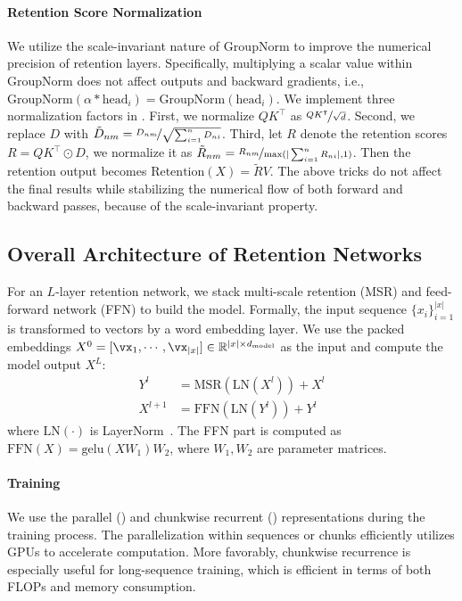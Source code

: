 \documentclass{article}
\begin{document}
\paragraph{Retention Score Normalization}
We utilize the scale-invariant nature of $\mathrm{GroupNorm}$ to improve the numerical precision of retention layers.
Specifically, multiplying a scalar value within $\mathrm{GroupNorm}$ does not affect outputs and backward gradients, i.e., $\mathrm{GroupNorm}(\alpha * \mathrm{head}_i) = \mathrm{GroupNorm}(\mathrm{head}_i)$.
We implement three normalization factors in .
First, we normalize $Q K^\intercal$ as $\nicefrac{Q K^\intercal}{\sqrt{d}}$.
Second, we replace $D$ with $\tilde{D}_{nm} = \nicefrac{D_{nm}}{\sqrt{\sum_{i=1}^{n}D_{ni}}}$.
Third, let $R$ denote the retention scores $R=QK^\intercal \odot D$, we normalize it as $\tilde{R}_{nm} = \nicefrac{R_{nm}}{\max(| \sum_{i=1}^{n} R_{ni} |, 1)}$. Then the retention output becomes $\mathrm{Retention}(X) = \tilde{R} V$.
The above tricks do not affect the final results while stabilizing the numerical flow of both forward and backward passes, because of the scale-invariant property.

\subsection{Overall Architecture of Retention Networks}
\label{sec:arch}

For an $L$-layer retention network, we stack multi-scale retention (MSR) and feed-forward network (FFN) to build the model.
Formally, the input sequence $\{x_i\}_{i=1}^{|x|}$ is transformed to vectors by a word embedding layer. We use the packed embeddings $X^0 = [\vx_1, \cdots, \vx_{|x|}] \in \mathbb{R}^{|x|\times d_\text{model}}$ as the input and compute the model output $X^L$:
\begin{equation}
\begin{aligned}
\label{eq:arch}
Y^l &= \mathrm{MSR}(\mathrm{LN}(X^l)) + X^l \\
X^{l+1} &= \mathrm{FFN}(\mathrm{LN}(Y^l)) + Y^l
\end{aligned}
\end{equation}
where $\mathrm{LN}(\cdot)$ is LayerNorm~\cite{layernorm}.
The FFN part is computed as $\mathrm{FFN}(X) = \mathrm{gelu}(X W_1) W_2$, where $W_1, W_2$ are parameter matrices.

\paragraph{Training}
We use the parallel () and chunkwise recurrent 
() representations during the training process.
The parallelization within sequences or chunks efficiently utilizes GPUs to accelerate computation.
More favorably, chunkwise recurrence is especially useful for long-sequence training, which is efficient in terms of both FLOPs and memory consumption.
\end{document}
